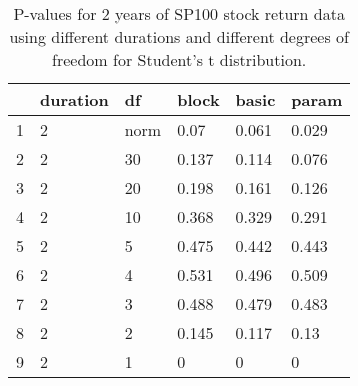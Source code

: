 \begin{table}[ht]
\centering
\caption{P-values for 2 years of SP100 stock return 
                   data using different durations
  and different degrees of freedom for Student's t distribution.} 
\label{table:SP1002}
\begin{tabular}{rlllll}
  \hline
 & duration & df & block & basic & param \\ 
  \hline
1 & 2 & norm & 0.07 & 0.061 & 0.029 \\ 
  2 & 2 & 30 & 0.137 & 0.114 & 0.076 \\ 
  3 & 2 & 20 & 0.198 & 0.161 & 0.126 \\ 
  4 & 2 & 10 & 0.368 & 0.329 & 0.291 \\ 
  5 & 2 & 5 & 0.475 & 0.442 & 0.443 \\ 
  6 & 2 & 4 & 0.531 & 0.496 & 0.509 \\ 
  7 & 2 & 3 & 0.488 & 0.479 & 0.483 \\ 
  8 & 2 & 2 & 0.145 & 0.117 & 0.13 \\ 
  9 & 2 & 1 & 0 & 0 & 0 \\ 
   \hline
\end{tabular}
\end{table}

